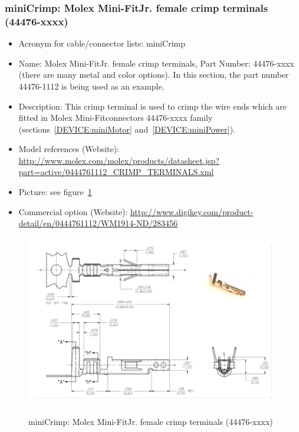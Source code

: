 \subsubsection{miniCrimp: Molex Mini-Fit\textregistered Jr. female crimp terminals (44476-xxxx)} \label{DEVICE:miniCrimp}
\begin{itemize}
  \item Acronym for cable/connector lists: miniCrimp
  \item Name: Molex Mini-Fit\textregistered Jr. female crimp terminals, Part Number: 44476-xxxx (there are many metal and color options). In this section, the part number 44476-1112 is being used as an example.
  \item Description: This crimp terminal is used to crimp the wire ends which are fitted in Molex Mini-Fit\textregistered connectors 44476-xxxx family (sections~\ref{DEVICE:miniMotor} and~\ref{DEVICE:miniPower}).
  \item Model references (Website): \href{http://www.molex.com/molex/products/datasheet.jsp?part=active/0444761112\_CRIMP\_TERMINALS.xml}{http://www.molex.com/molex/products/datasheet.jsp?part=active/0444761112\_CRIMP\_TERMINALS.xml}
  \item Picture: see figure~\ref{FIG:DEVICEminiCrimp}
  \item Commercial option (Website): \href{http://www.digikey.com/product-detail/en/0444761112/WM1914-ND/283456}{http://www.digikey.com/product-detail/en/0444761112/WM1914-ND/283456}
\end{itemize}
\begin{figure}
  \centering
  \includegraphics[angle=90,width=1\columnwidth]{figs/body02/FIGDEVICEminiCrimp.pdf}\\
  \caption[miniCrimp: Molex Mini-Fit\textregistered Jr. female crimp terminals (44476-xxxx)]{miniCrimp: Molex Mini-Fit\textregistered Jr. female crimp terminals (44476-xxxx)}
  \label{FIG:DEVICEminiCrimp}
\end{figure} 